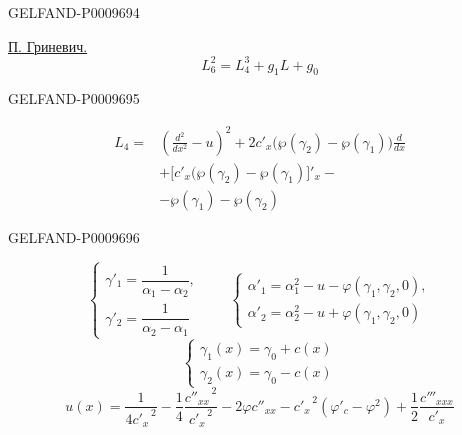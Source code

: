 \begin{GelfandAdjacentEvidence}{GELFAND-P000969}{4}


\underline{П. Гриневич.}
\begin{equation*}
 L_6^2=L_4^3+g_1L+g_0\tag{1}
\end{equation*}
\end{GelfandAdjacentEvidence}
\begin{GelfandAdjacentEvidence}{GELFAND-P000969}{5}

\begin{equation*}
\begin{aligned}
 L_4={}&\left(\frac{d^2}{dx^2}-u\right)^2
 +2c'_x\bigl(\wp(\gamma_2)-\wp(\gamma_1)\bigr)\frac{d}{dx}\\
 &+\bigl[c'_x(\wp(\gamma_2)-\wp(\gamma_1)\bigr]'_x-\\
 &-\wp(\gamma_1)-\wp(\gamma_2)
\end{aligned}\tag{2}
\end{equation*}
\end{GelfandAdjacentEvidence}
\begin{GelfandAdjacentEvidence}{GELFAND-P000969}{6}

\end{GelfandAdjacentEvidence}

\begin{equation*}
 \begin{cases}
 \gamma'_1=\dfrac{1}{\alpha_1-\alpha_2},\\[.4em]
 \gamma'_2=\dfrac{1}{\alpha_2-\alpha_1}
 \end{cases}
 \qquad
 \begin{cases}
 \alpha'_1=\alpha_1^2-u-\varphi(\gamma_1,\gamma_2,0),\\
 \alpha'_2=\alpha_2^2-u+\varphi(\gamma_1,\gamma_2,0)
 \end{cases}\tag{3}
\end{equation*}
\[
 \begin{cases}
 \gamma_1(x)=\gamma_0+c(x)\\
 \gamma_2(x)=\gamma_0-c(x)
 \end{cases}
\]
\[
 u(x)=\frac{1}{4{c'_x}^{\,2}}
 -\frac14\frac{{c''_{xx}}^{\,2}}{{c'_x}^{\,2}}
 -2\varphi c''_{xx}
 -{c'_x}^{\,2}(\varphi'_c-\varphi^2)
 +\frac12\frac{c'''_{xxx}}{c'_x}
\]

